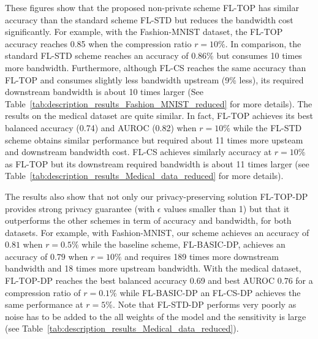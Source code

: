 \documentclass[accepted]{uai2021} %
\begin{document}
These figures show that the proposed non-private scheme FL-TOP has similar accuracy than the standard scheme FL-STD but reduces the bandwidth cost significantly.
For example, with the Fashion-MNIST dataset, the FL-TOP accuracy reaches 0.85  when the compression ratio $r=10\%$. In comparison, the standard FL-STD scheme reaches an accuracy of 0.86\% but consumes 10 times more bandwidth. Furthermore, although FL-CS reaches the same accuracy than FL-TOP and consumes slightly less bandwidth upstream (9\% less), its required downstream bandwidth is about 10 times larger (See Table~\ref{tab:description_results_Fashion_MNIST_reduced} for more details).
The results on the medical dataset are quite similar. In fact, FL-TOP achieves its best balanced accuracy (0.74) and AUROC (0.82) when $r=10\%$ while the FL-STD scheme obtains similar performance but required about 11 times more upsteam and downstream bandwidth cost. FL-CS achieves similarly accuracy at $r=10\%$ as FL-TOP but its downstream required bandwidth is about 11 times larger (see Table~\ref{tab:description_results_Medical_data_reduced} for more details).


The results also show that not only our privacy-preserving solution FL-TOP-DP provides strong privacy guarantee (with $\epsilon$ values smaller than 1) but that it outperforms the other schemes in term of accuracy and bandwidth, for both datasets. 
For example, with Fashion-MNIST, our scheme achieves an accuracy of $0.81$ when  $r=0.5\%$ while the baseline scheme, FL-BASIC-DP, achieves an accuracy of $0.79$ when $r=10\%$ and requires 189 times more downstream bandwidth and 18 times more upstream bandwidth.  With the medical dataset,  FL-TOP-DP reaches the best balanced accuracy 0.69 and best AUROC $0.76$ for a compression ratio of  $r=0.1\%$ while FL-BASIC-DP an FL-CS-DP achieves the same performance at $r=5\%$.  Note that FL-STD-DP performs very poorly as noise has to be added to the all weights of the model and the sensitivity is large (see Table~\ref{tab:description_results_Medical_data_reduced}).

\end{document}
